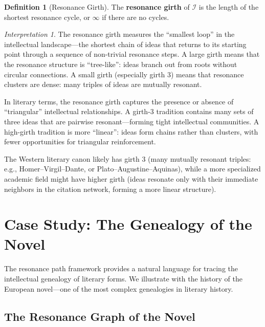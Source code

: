 \documentclass[11pt,openany]{book}
\theoremstyle{definition}
\newtheorem{definition}[axiom]{Definition}
\theoremstyle{plain}
\theoremstyle{remark}
\newtheorem{interpretation}[axiom]{Interpretation}
\newcommand{\IS}{\mathcal{I}}               %
\begin{document}
\begin{definition}[Resonance Girth]
The \textbf{resonance girth} of $\IS$ is the length of the shortest resonance cycle, or $\infty$ if there are no cycles.
\end{definition}

\begin{interpretation}
The resonance girth measures the ``smallest loop'' in the intellectual landscape---the shortest chain of ideas that returns to its starting point through a sequence of non-trivial resonance steps. A large girth means that the resonance structure is ``tree-like'': ideas branch out from roots without circular connections. A small girth (especially girth 3) means that resonance clusters are dense: many triples of ideas are mutually resonant.

In literary terms, the resonance girth captures the presence or absence of ``triangular'' intellectual relationships. A girth-3 tradition contains many sets of three ideas that are pairwise resonant---forming tight intellectual communities. A high-girth tradition is more ``linear'': ideas form chains rather than clusters, with fewer opportunities for triangular reinforcement.

The Western literary canon likely has girth 3 (many mutually resonant triples: e.g., Homer--Virgil--Dante, or Plato--Augustine--Aquinas), while a more specialized academic field might have higher girth (ideas resonate only with their immediate neighbors in the citation network, forming a more linear structure).
\end{interpretation}

\section{Case Study: The Genealogy of the Novel}

The resonance path framework provides a natural language for tracing the intellectual genealogy of literary forms. We illustrate with the history of the European novel---one of the most complex genealogies in literary history.

\subsection{The Resonance Graph of the Novel}
\end{document}
